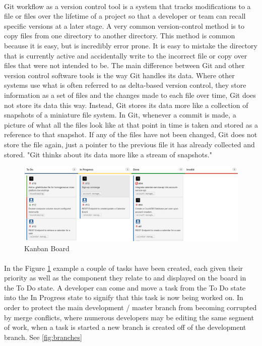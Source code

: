 \paragraph{}
Git workflow as a version control tool is a system that tracks modifications to a file or files over the lifetime of a project so that a developer or team can recall specific versions at a later stage. A very common version-control method is to copy files from one directory to another directory. This method is common because it is easy, but is incredibly error prone. It is easy to mistake the directory that is currently active and accidentally write to the incorrect file or copy over files that were not intended to be.\cite{chachon} The main difference between Git and other version control software tools is the way Git handles its data. Where other systems use what is often referred to as delta-based version control, they store information as a set of files and the changes made to each file over time, Git does not  store its data this way. Instead, Git stores its data more like a collection of snapshots of a miniature file system. In Git, whenever a commit is made, a picture of what all the files look like at that point in time is taken and stored as a reference to that snapshot.\cite{chachon} If any of the files have not been changed, Git does not store the file again, just a pointer to the previous file it has already collected and stored. "Git thinks about its data more like a stream of snapshots."\cite{chachon}



\begin{figure}
\includegraphics[width=\textwidth]{img/Kanban.PNG}
\caption{Kanban Board}
\label{fig:kanban}
\end{figure}

\paragraph{}In the Figure \ref{fig:kanban} example a couple of tasks have been created, each given their priority as well as the component they relate to and displayed on the board in the To Do state. A developer can come and move a task from the To Do state into the In Progress state to signify that this task is now being worked on. In order to protect the main development / master branch from becoming corrupted by merge conflicts, where numerous developers may be editing the same segment of work, when a task is started a new branch is created off of the development branch\cite{driessen}. See \ref{fig:branches}

